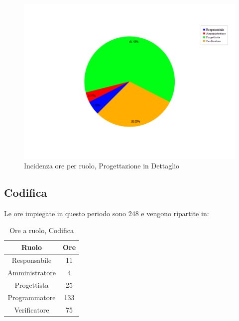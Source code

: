 \begin{figure}[H]
	\centering
	\includegraphics[scale=0.3]{immagini/Grafi/OreRuoloPD}
	\caption{Incidenza ore per ruolo, Progettazione in Dettaglio}
\end{figure}

\subsection{Codifica}
Le ore impiegate in questo periodo sono 248 e vengono ripartite in:
\begin{table}[H]
	\begin{center}
		\begin{tabular}{|c|c|}
			\hline
			\textbf{Ruolo}	& \textbf{Ore} \\
			\hline
			Responsabile	&	11	\\
			\hline
			Amministratore	&	4	\\
			\hline
			Progettista		&	25	\\
			\hline
			Programmatore	&	133	\\
			\hline
			Verificatore	&	75	\\
			\hline
		\end{tabular}
	\end{center}
	\caption{Ore a ruolo, Codifica}
\end{table}

